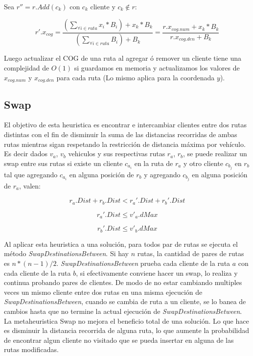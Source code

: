 \bigskip

Sea $r'' = r.Add(c_k)$ con $c_k$ cliente y $c_k \notin r$:

\begin{equation}
r'.x_{cog} =  \frac{(\sum_{\forall i \in ruta} x_i * B_i) + x_k * B_k}{(\sum_{\forall i \in ruta} B_i) + B_k}  = \frac{r.x_{cog.num}+x_k*B_k}{r.x_{cog.den}+B_k}
\end{equation}

\bigskip

Luego actualizar el COG de una ruta al agregar ó remover un cliente tiene una complejidad de $O(1)$ si guardamos en memoria y actualizamos los valores de $x_{cog.num}$ y $x_{cog.den}$ para cada ruta (Lo mismo aplica para la coordenada $y$).

\bigskip



\subsection{Swap}

El objetivo de esta heuristica es encontrar e intercambiar clientes entre dos rutas distintas con el fin de disminuir la suma de las distancias recorridas de ambas rutas mientras sigan respetando la restricción de distancia máxima por vehículo. Es decir dados $v_a$, $v_b$ vehiculos y sus respectivas rutas $r_a$, $r_b$, se puede realizar un swap entre sus rutas si existe un cliente $c_{a_i}$ en la ruta de $r_a$ y otro cliente $c_{b_j}$ en $r_b$ tal que agregando $c_{a_i}$ en alguna posición de $r_b$ y agregando $c_{b_j}$ en alguna posición de $r_a$, valen:

\begin{equation*}
r_a.Dist + r_b.Dist < r_a'.Dist + r_b'.Dist \nonumber
\end{equation*}

\begin{equation*}
r_a'.Dist \leq v'_a.dMax
\end{equation*}

\begin{equation*}
r_b'.Dist \leq v'_b.dMax
\end{equation*}

Al aplicar esta heuristica a una solución, para todos par de rutas se ejecuta el método \textit{SwapDestinationsBetween}. Si hay $n$ rutas, la cantidad de pares de rutas es $n * (n-1) / 2$. \textit{SwapDestinationsBetween} prueba cada cliente de la ruta $a$ con cada cliente de la ruta $b$, si efectivamente conviene hacer un swap, lo realiza y continua probando pares de clientes. De modo de no estar cambiando multiples veces un mismo cliente entre dos rutas en una misma ejecución de \textit{SwapDestinationsBetween}, cuando se cambia de ruta a un cliente, se lo banea de cambios hasta que no termine la actual ejecución de \textit{SwapDestinationsBetween}. La metaheuristica Swap no mejora el beneficio total de una solución. Lo que hace es disminuir la distancia recorrida de alguna ruta, lo que aumente la probabilidad de encontrar algun cliente no visitado que se pueda insertar en alguna de las rutas modificadas.

